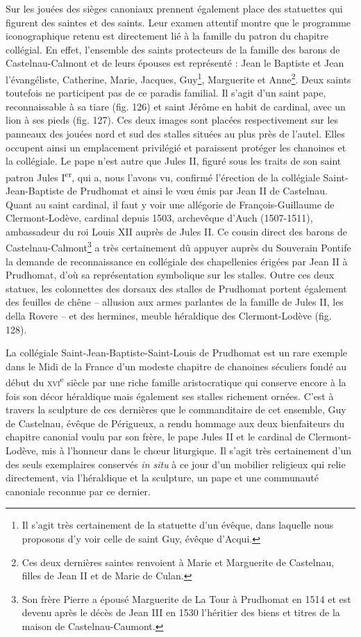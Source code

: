 \documentclass[12pt,twoside,openany]{book}
\begin{document}
Sur les jouées des sièges canoniaux prennent également place des statuettes qui figurent des saintes et des saints. Leur examen attentif montre que le programme iconographique retenu est directement lié à la famille du patron du chapitre collégial. En effet, l’ensemble des saints protecteurs de la famille des barons de Castelnau-Calmont et de leurs épouses est représenté : Jean le Baptiste et Jean l’évangéliste, Catherine, Marie, Jacques, Guy\footnote{Il s’agit très certainement de la statuette d’un évêque, dans laquelle nous proposons d’y voir celle de saint Guy, évêque d’Acqui.}, Marguerite et Anne\footnote{Ces deux dernières saintes renvoient à Marie et Marguerite de Castelnau, filles de Jean II et de Marie de Culan.}. Deux saints toutefois ne participent pas de ce paradis familial. Il s’agit d’un saint pape, reconnaissable à sa tiare (fig. 126) et saint Jérôme en habit de cardinal, avec un lion à ses pieds (fig. 127). Ces deux images sont placées respectivement sur les panneaux des jouées nord et sud des stalles situées au plus près de l’autel. Elles occupent ainsi un emplacement privilégié et paraissent protéger les chanoines et la collégiale. Le pape n’est autre que Jules II, figuré sous les traits de son saint patron Jules I\textsuperscript{er}, qui a, nous l’avons vu, confirmé l’érection de la collégiale Saint-Jean-Baptiste de Prudhomat et ainsi le vœu émis par Jean II de Castelnau. Quant au saint cardinal, il faut y voir une allégorie de François-Guillaume de Clermont-Lodève, cardinal depuis 1503, archevêque d’Auch (1507-1511), ambassadeur du roi Louis XII auprès de Jules II. Ce cousin direct des barons de Castelnau-Calmont\footnote{Son frère Pierre a épousé Marguerite de La Tour à Prudhomat en 1514 et est devenu après le décès de Jean III en 1530 l’héritier des biens et titres de la maison de Castelnau-Caumont.} a très certainement dû appuyer auprès du Souverain Pontife la demande de reconnaissance en collégiale des chapellenies érigées par Jean II à Prudhomat, d’où sa représentation symbolique sur les stalles. Outre ces deux statues, les colonnettes des dorsaux des stalles de Prudhomat portent également des feuilles de chêne – allusion aux armes parlantes de la famille de Jules II, les della Rovere – et des hermines, meuble héraldique des Clermont-Lodève (fig. 128).

La collégiale Saint-Jean-Baptiste-Saint-Louis de Prudhomat est un rare exemple dans le Midi de la France d’un modeste chapitre de chanoines séculiers fondé au début du \textsc{xvi}\textsuperscript{e} siècle par une riche famille aristocratique qui conserve encore à la fois son décor héraldique mais également ses stalles richement ornées. C’est à travers la sculpture de ces dernières que le commanditaire de cet ensemble, Guy de Castelnau, évêque de Périgueux, a rendu hommage aux deux bienfaiteurs du chapitre canonial voulu par son frère, le pape Jules II et le cardinal de Clermont-Lodève, mis à l’honneur dans le chœur liturgique. Il s’agit très certainement d’un des seuls exemplaires conservés \textit{in situ} à ce jour d’un mobilier religieux qui relie directement, via l’héraldique et la sculpture, un pape et une communauté canoniale reconnue par ce dernier.
\end{document}
